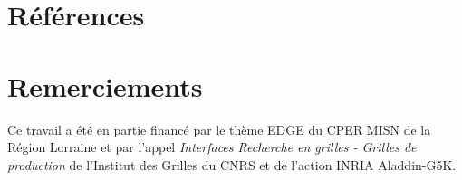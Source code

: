 \documentclass[a4paper,11pt]{article}
\begin{document}
\section{Références}



\section*{Remerciements}

Ce travail a été en partie financé par le thème EDGE du CPER MISN de la Région
Lorraine et par l'appel \textsl{Interfaces Recherche en grilles - Grilles de
production} de l'Institut des Grilles du CNRS et de l'action INRIA Aladdin-G5K.
\end{document}
